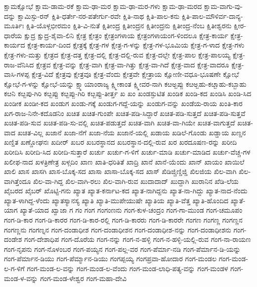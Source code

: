 ಕ್ಷಾಮಕ್ಷೋಭೆ
ಕ್ಷಾಮ-ಡಾಮ-ರಕೆ
ಕ್ಷಾಮ-ಢಾ-ಮರ
ಕ್ಷಾಮ-ಢಾ-ಮರ-ಗಳು
ಕ್ಷಾಮ-ಢಾ-ಮರದ
ಕ್ಷಾಮ-ವಾಗು-ವು-ದನ್ನು
ಕ್ಷಾಮಿಸ್ಫು-ರನ್
ಕ್ಷಿತಿ-ಧರ್ತೇ-ನರ-ಪತೇರ್ಗು-ರವೇ
ಕ್ಷಿತಿ-ನಾಥ
ಕ್ಷಿತಿ-ಪಾಲ-ಕನು
ಕ್ಷಿತಿ-ಪಾಲ-ಮೌಳಿರ್ವ-ದಾನ್ಯ-ಮೂರ್ತಿಃ
ಕ್ಷಿತಿ-ಯೊಳ್ಗಭೀರಮಂ
ಕ್ಷಿತಿ-ವಿ-ನುತೆ
ಕ್ಷಿತೀಂದ್ರ
ಕ್ಷಿತೀಂದ್ರನ
ಕ್ಷಿತೀಂದ್ರನು
ಕ್ಷಿತೀಂದ್ರ-ನೆಂಬ
ಕ್ಷಿತೀಶ್ವರನು
ಕ್ಷೀರ-ಧಾರೆಯ
ಕ್ಷುದ್ರ
ಕ್ಷುದ್ರ-ಶೈವಾ-ಲಿನಿ
ಕ್ಷೇತ್ರ
ಕ್ಷೇತ್ರಂ
ಕ್ಷೇತ್ರಂಗಳಾಯ
ಕ್ಷೇತ್ರಂಗಳಾಯಂಗ-ಳಿಂದಲೂ
ಕ್ಷೇತ್ರ-ಕಾರ್ಯ
ಕ್ಷೇತ್ರ-ಕಾರ್ಯದ
ಕ್ಷೇತ್ರ-ಕಾರ್ಯ-ದಿಂದ
ಕ್ಷೇತ್ರಕ್ಕೆ
ಕ್ಷೇತ್ರ-ಗಳ
ಕ್ಷೇತ್ರ-ಗ-ಳನ್ನು
ಕ್ಷೇತ್ರ-ಗಳ-ಭೂಮಿಯ
ಕ್ಷೇತ್ರ-ಗ-ಳಾದ
ಕ್ಷೇತ್ರ-ಗಳು
ಕ್ಷೇತ್ರ-ಗಳು-ಮತ್ತು
ಕ್ಷೇತ್ರದ
ಕ್ಷೇತ್ರ-ದತ್ತ
ಕ್ಷೇತ್ರ-ದಲ್ಲಿ
ಕ್ಷೇತ್ರ-ದಲ್ಲಿ-ರುವ
ಕ್ಷೇತ್ರ-ದಲ್ಲೇ
ಕ್ಷೇತ್ರ-ಪಾಲ
ಕ್ಷೇತ್ರ-ಪಾಲಯ್ಯ
ಕ್ಷೇತ್ರ-ರಾಜ-ವೆನಿಸಿದ
ಕ್ಷೇತ್ರವ
ಕ್ಷೇತ್ರ-ವನ್ನು
ಕ್ಷೇತ್ರ-ವಾಗಿ
ಕ್ಷೇತ್ರ-ವಾ-ಗಿತ್ತು
ಕ್ಷೇತ್ರ-ವಾ-ಗಿದೆ
ಕ್ಷೇತ್ರ-ವಾದ
ಕ್ಷೇತ್ರ-ವಾದರೂ
ಕ್ಷೇತ್ರ-ವಾಸಿ-ಗಳಪ್ಪ
ಕ್ಷೇತ್ರ-ವಿದೆ
ಕ್ಷೇತ್ರವು
ಕ್ಷೇತ್ರವೂ
ಕ್ಷೇತ್ರ-ವೆಂದು
ಕ್ಷೇತ್ರವೇ
ಕ್ಷೇತ್ರಾಯ
ಕ್ಷೋಣೀ-ವಧೂ-ಭೂಷಣೇ
ಕ್ಷೋಭೆ
ಕ್ಷೋಭೆ-ಗ-ಳನ್ನು
ಕ್ಷೋಭೆ-ಯನ್ನು
ಕ್ಷ್ಮಾಯಾಂರಾಜ್ಯ
ಕ್ಷ್ಮೀಕಾಂತ
ಕ್ಷ್ಮೀವರ-ನಾಗಿ
ಕೞಅ್ಬಪ್ಪು
ಕೞಅ್ಬಹು-ಕೞ್ಬಾಹು-ಕಬ್ಬಾಹು
ಕೞನಿ
ಕೞ್ಬಪು-ಗಿರಿ
ಕೞ್ಬಪ್ಪು
ಕೞ್ಬಪ್ಪು-ಗಿರಿ
ಕೞ್ಬಪ್ಪು-ತೀರ್ತ್ತ
ಖ
ಖಂ
ಖಂಡಸ್ಫುಟಿತ
ಖಂಡಿಕ
ಖಂಡಿ-ಕದ
ಖಂಡಿಸಿ
ಖಂಡಿ-ಸಿದ
ಖಂಡೀಕ
ಖಂಡೀ-ಕದ
ಖಂಡುಗ
ಖಂಡು-ಗಕ್ಕೆ
ಖಂಡುಗ-ಗದ್ದೆ-ಯನ್ನು
ಖಂಡುಗ-ವನ್ನು
ಖಂಡೆಯ-ರಾಯ
ಖಂತಿ-ಕಾರ
ಖಗ-ರಾಜ-ನಿನೇ-ಕದೊಡನಿಂ
ಖಚಿತ
ಖಚಿತ-ಗುಂಪೇ
ಖಚಿತ-ಪಡಿ-ಸಿದ್ದಾರೆ
ಖಚಿತ-ಪಡಿ-ಸುತ್ತದೆ
ಖಚಿತ-ಪಡಿ-ಸುತ್ತವೆ
ಖಚಿತ-ಪಡಿ-ಸುವ
ಖಚಿತ-ಪಡಿ-ಸು-ವಲ್ಲಿ
ಖಚಿತ-ಪಡುತ್ತದೆ
ಖಚಿತ-ವಾಗಿ
ಖಚಿತ-ವಾ-ಗಿಯೇ
ಖಚಿತ-ವಾಗುತ್ತದೆ
ಖಚಿತ-ವಾದ
ಖಚಿತ-ವಿಲ್ಲ
ಖಜಾನೆ
ಖಜಾ-ನೆಗೆ
ಖಜಾ-ನೆಯ
ಖಜಾನೆ-ಯಲ್ಲಿ
ಖಡಾಯ
ಖಡಿಲೆ-ಗೊಂಡು
ಖಡ್ಡಾಯ
ಖಣ್ಡನ
ಖಣ್ಡಿತ
ಖಣ್ಡೋಘನಃ
ಖದೀರ್
ಖಬರ
ಖಬರಸ್ಥಾನದ
ಖಬರಸ್ಥಾನ-ದಲ್ಲಿ-ರುವ
ಖರ
ಖರದೂಷಣ-ರನ್ನು
ಖರೀದಿ
ಖರೀದಿಸಿ
ಖರೀದಿ-ಸಿದ
ಖರೀದಿ-ಸುತ್ತಾರೆ
ಖರ್ಚು
ಖರ್ಚು-ಗ-ಳಿಗೆ
ಖರ್ಚು-ಮಾಡಿ
ಖರ್ಚು-ಮಾಡಿದ
ಖರ್ಚು-ವೆಚ್ಚ-ಗಳ
ಖಲೀಫ-ನಾದ
ಖಳತ್ರಿಣೇತ್ರ
ಖಳ್ಗದಿಂ
ಖಾಣ
ಖಾತಿ-ಧರಿತಿತೆ
ಖಾದ್ರಿ
ಖಾನೆ
ಖಾನೆ-ಯೆಂದು
ಖಾನ್
ಖಾಯಂ
ಖಾಯಿಲೆ
ಖಾಲಿ
ಖಾಸ
ಖಾಸಗಿ
ಖಾಸ-ಬೊಕ್ಕ-ಸದ
ಖಾಸಾ
ಖಾಸಾ-ಬೊಕ್ಕ-ಸದ
ಖಾಸ್
ಖಿಡಿಜ್ಚಿಣ್ಡಿಜ್ಡಿ
ಖಿಲಜಿಯ
ಖಿಲ-ವಾಗಿ
ಖಿಲ-ವಾಗಿತ್ತೆಂದೂ
ಖಿಲ-ವಾ-ಗಿದ್ದ
ಖಿಲ-ವಾಗಿ-ರಲು
ಖಿಲ-ವಾಗಿ-ರುವ
ಖುದಾದಾದ್
ಖುದ್ದಾಗಿ
ಖುರಾನಿನ
ಖೆಡಿ-ಲೆಯ
ಖೈಬರದ
ಖೈಬರ್
ಖೊಟ್ಟಿ-ಗನು
ಖ್ಯಾತ
ಖ್ಯಾತ-ಕರ್ನಾಟ-ಕದ
ಖ್ಯಾತ-ನಾಗಿದ್ದನು
ಖ್ಯಾತ-ನಾ-ಗಿದ್ದು
ಖ್ಯಾತ-ನಾದ-ನೆಂದು
ಖ್ಯಾತ-ಳಾಗಿದ್ದ-ಳೆಂದು
ಖ್ಯಾತಸ್ಯಾನಸ್ಯ
ಖ್ಯಾತಿ
ಖ್ಯಾತಿ-ಮುಪೇಯುಷೇ
ಖ್ಯಾತಿಯ
ಖ್ಯಾತಿ-ವೆತ್ತ
ಖ್ಯಾತಿ-ಹೊಂದಿದ
ಖ್ಯಾತೆ-ಯಾಗ
ಖ್ಯಾತೆ-ಯಾದ
ಖ್ವಾಜಾ
ಗ
ಗಂ
ಗಂಗ
ಗಂಗಂಣನು
ಗಂಗ-ಕುಳ-ಚಂದ್ರಂ
ಗಂಗ-ಗಾ-ಮುಂಡ
ಗಂಗ-ಚಮೂಪಂ
ಗಂಗ-ಡಿ-ಕಾರ
ಗಂಗ-ಡಿ-ಕಾರರ
ಗಂಗ-ಡಿ-ಕಾರ-ರಲ್ಲಿ
ಗಂಗ-ಡಿ-ಕಾರರು
ಗಂಗ-ಡಿ-ಕಾರರೇ
ಗಂಗಣ
ಗಂಗಣ್ಣ
ಗಂಗಣ್ಣನ
ಗಂಗಣ್ಣನು
ಗಂಗಣ್ನನ
ಗಂಗ-ದಂಡಾಧೀಶ
ಗಂಗ-ದಂಡಾಧೀಶನ
ಗಂಗ-ದಂಡಾಧೀಶ-ನನ್ನು
ಗಂಗ-ದಂಡಾಧೀಶನು
ಗಂಗ-ದಂಡೇಶ
ಗಂಗ-ದೇಶಾಧಿಪ
ಗಂಗ-ದೊರೆಯ
ಗಂಗ-ನನ್ನು
ಗಂಗ-ನ-ಹಳ್ಳಿ
ಗಂಗ-ನ-ಹಳ್ಳಿ-ಯಲ್ಲಿ-ರುವ
ಗಂಗ-ನಾ-ರಾಯಣ
ಗಂಗ-ನೃಪನು
ಗಂಗ-ನೊಳಂಬರ
ಗಂಗ-ಪಯ್ಯನ
ಗಂಗ-ಪಲ್ಲ-ವರ
ಗಂಗ-ಪೆರ್ಮಾ-ನಡಿ
ಗಂಗ-ಪೆರ್ಮಾನ-ಡಿ-ಯನ್ನು
ಗಂಗ-ಪೆರ್ಮಾನ-ಡಿಯು
ಗಂಗ-ಪೆರ್ಮ್ಮಾನ-ಡಿಯು
ಗಂಗಪ್ಪಯ್ಯ
ಗಂಗಪ್ರವಾ-ಹೋದಾರ
ಗಂಗ-ಮಂಡಲ
ಗಂಗ-ಮಂಡ-ಲ-ಗ-ಳಿಗೆ
ಗಂಗ-ಮಂಡ-ಲ-ವನ್ನು
ಗಂಗ-ಮಂಡ-ಲ-ವೆಂದು
ಗಂಗ-ಮಂಡ-ಲಾಧಿ-ಪತ್ಯ-ವನ್ನು
ಗಂಗ-ಮಂಡಳ
ಗಂಗ-ಮಂಡ-ಳ-ವನ್ನು
ಗಂಗ-ಮಂಡ-ಳೇಶ್ವರ
ಗಂಗ-ಮಹಾ-ದೇವಿ
